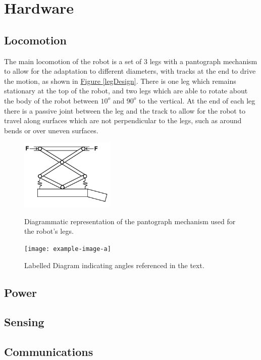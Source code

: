 \documentclass[11pt]{article}		%
\begin{document}
	\section{Hardware}
	
		\subsection{Locomotion}
		
			The main locomotion of the robot is a set of 3 legs with a pantograph mechanism  to allow for the adaptation to different diameters, with tracks at the end to drive the motion, as shown in \hyperref[legDesign]{Figure \ref*{legDesign}}.
			There is one leg which remains stationary at the top of the robot, and two legs which are able to rotate about the body of the robot between $10^o$ and $90^o$ to the vertical.
			At the end of each leg there is a passive joint between the leg and the track to allow for the robot to travel along surfaces which are not perpendicular to the legs, such as around bends or over uneven surfaces.
			\begin{figure}[h]
				\centering
				\begin{multicols}{2}
					\includegraphics[width=0.4\textwidth]{legDesign}
					\caption{Diagrammatic representation of the pantograph mechanism used for the robot's legs.}
					\label{legDesign}
					\columnbreak
					\texttt{[image: example-image-a]}
					\caption{Labelled Diagram indicating angles referenced in the text.}
					\label{legMaths}
				\end{multicols}
			\end{figure}		
		\subsection{Power}
		
		\subsection{Sensing}
		
		\subsection{Communications}
		
\end{document}
